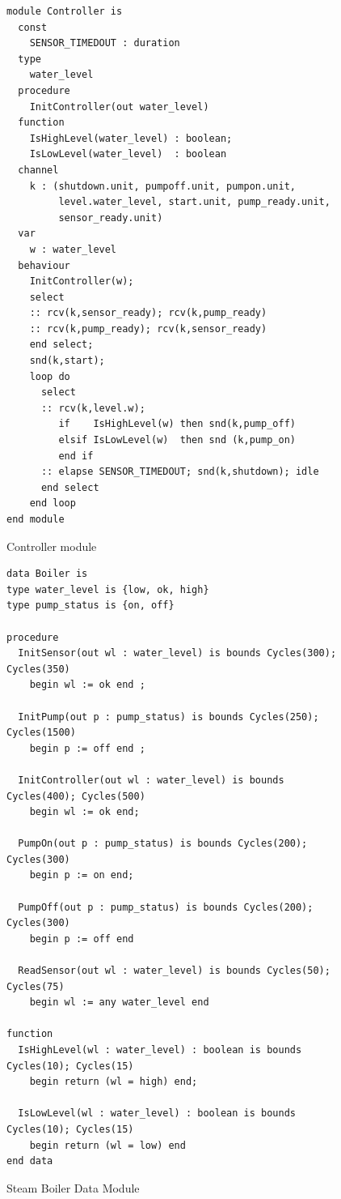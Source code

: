 \begin{figure}
\begin{center}
\begin{minipage}{.7\linewidth}
\scriptsize
\begin{verbatim}
module Controller is
  const 
    SENSOR_TIMEDOUT : duration
  type 
    water_level
  procedure
    InitController(out water_level)
  function
    IsHighLevel(water_level) : boolean;
    IsLowLevel(water_level)  : boolean
  channel 
    k : (shutdown.unit, pumpoff.unit, pumpon.unit,
         level.water_level, start.unit, pump_ready.unit,
         sensor_ready.unit)
  var 
    w : water_level
  behaviour
    InitController(w);
    select
    :: rcv(k,sensor_ready); rcv(k,pump_ready)
    :: rcv(k,pump_ready); rcv(k,sensor_ready)
    end select;
    snd(k,start);
    loop do
      select
      :: rcv(k,level.w);
         if    IsHighLevel(w) then snd(k,pump_off)
         elsif IsLowLevel(w)  then snd (k,pump_on)
         end if
      :: elapse SENSOR_TIMEDOUT; snd(k,shutdown); idle
      end select
    end loop
end module
\end{verbatim}
\end{minipage}
\end{center}
\caption{Controller module\label{fig:prcontroller}}
\end{figure}

\begin{figure}
\begin{center}
\begin{minipage}{.8\linewidth}
\scriptsize
\begin{verbatim}
data Boiler is
type water_level is {low, ok, high}
type pump_status is {on, off}

procedure 
  InitSensor(out wl : water_level) is bounds Cycles(300); Cycles(350)
    begin wl := ok end ;

  InitPump(out p : pump_status) is bounds Cycles(250); Cycles(1500)
    begin p := off end ;

  InitController(out wl : water_level) is bounds Cycles(400); Cycles(500) 
    begin wl := ok end;

  PumpOn(out p : pump_status) is bounds Cycles(200); Cycles(300)
    begin p := on end;

  PumpOff(out p : pump_status) is bounds Cycles(200); Cycles(300)
    begin p := off end 

  ReadSensor(out wl : water_level) is bounds Cycles(50); Cycles(75)
    begin wl := any water_level end

function 
  IsHighLevel(wl : water_level) : boolean is bounds Cycles(10); Cycles(15)
    begin return (wl = high) end;

  IsLowLevel(wl : water_level) : boolean is bounds Cycles(10); Cycles(15)
    begin return (wl = low) end
end data
\end{verbatim}
\end{minipage}
\end{center}
\caption{Steam Boiler Data Module\label{fig:prboilerdata}}
\end{figure}

